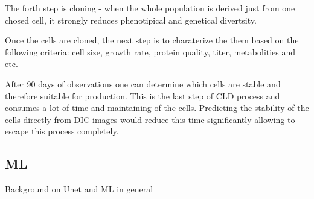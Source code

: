 The forth step is cloning - when the whole population is derived just from one chosed cell, it strongly reduces phenotipical and genetical divertsity. 

Once the cells are cloned, the next step is to charaterize the them based on the following criteria: cell size, growth rate, protein quality, titer, metabolities and etc. 

After 90 days of observations one can determine which cells are stable and therefore suitable for production. This is the last step of CLD process and consumes a lot of time and maintaining of the cells. Predicting the stability of the cells directly from DIC images would reduce this time significantly allowing to escape this process completely.

\subsection{ML}
Background on Unet and ML in general
